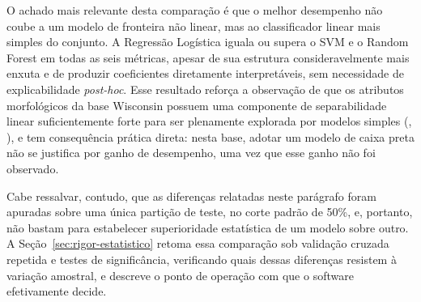 \documentclass[
    12pt
    ,oneside
    ,a4paper
    ,chapter=TITLE
    ,section=TITLE
    ,sumario=abnt-6027-2012
    ,english,brazil]{abntex2} %
\begin{document}
O achado mais relevante desta comparação é que o melhor desempenho não coube a
um modelo de fronteira não linear, mas ao classificador linear mais simples do
conjunto. A Regressão Logística iguala ou supera o SVM e o Random Forest em
todas as seis métricas, apesar de sua estrutura consideravelmente mais enxuta e
de produzir coeficientes diretamente interpretáveis, sem necessidade de
explicabilidade \textit{post-hoc}. Esse resultado reforça a observação de que os
atributos morfológicos da base Wisconsin possuem uma componente de separabilidade
linear suficientemente forte para ser plenamente explorada por modelos simples
(, \citeyear{Bishop2006}), e tem consequência
prática direta: nesta base, adotar um modelo de caixa preta não se justifica por
ganho de desempenho, uma vez que esse ganho não foi observado.

Cabe ressalvar, contudo, que as diferenças relatadas neste parágrafo foram
apuradas sobre uma única partição de teste, no corte padrão de 50\%, e,
portanto, não bastam para estabelecer superioridade estatística de um modelo
sobre outro. A Seção~\ref{sec:rigor-estatistico} retoma essa comparação sob
validação cruzada repetida e testes de significância, verificando quais dessas
diferenças resistem à variação amostral, e descreve o ponto de operação com que
o software efetivamente decide.


\end{document}
